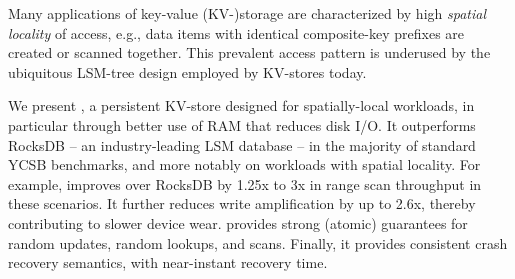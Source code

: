 Many applications of key-value (KV-)storage  are characterized by high \emph{spatial locality}
of access, e.g., data items with identical composite-key prefixes are created or scanned together.  
This prevalent access pattern is underused by the ubiquitous LSM-tree design employed by KV-stores today.

We present \sys, a persistent KV-store designed for spatially-local workloads, in particular through better use of RAM
that reduces disk I/O.  It outperforms RocksDB -- an industry-leading LSM database -- in the majority 
of standard YCSB benchmarks, and more notably on workloads with spatial locality. For example, \sys\/ 
improves over RocksDB by 1.25x to 3x in range scan throughput in these scenarios. It further reduces write amplification 
by up to 2.6x, thereby contributing to slower device wear. \sys\/ provides strong (atomic) guarantees for random updates, random lookups, and scans. Finally, it provides consistent crash recovery semantics, with near-instant recovery time. 